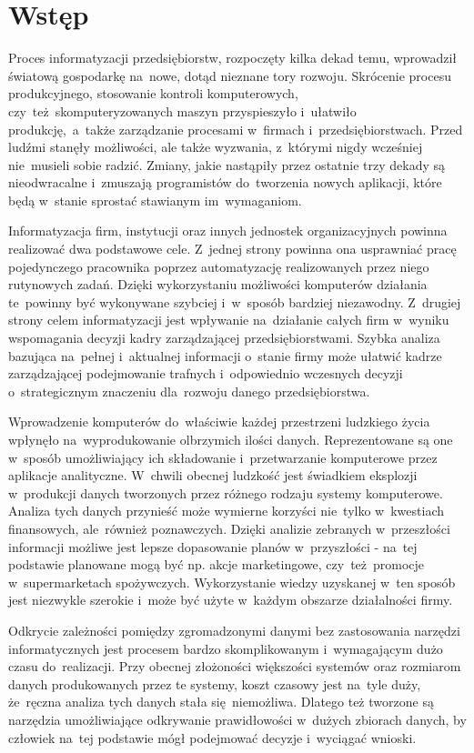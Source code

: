 \chapter{Wstęp}
Proces informatyzacji przedsiębiorstw, rozpoczęty kilka dekad temu, wprowadził światową gospodarkę na~nowe, dotąd nieznane tory rozwoju. Skrócenie procesu produkcyjnego, stosowanie kontroli komputerowych, czy~też~skomputeryzowanych maszyn przyspieszyło i~ułatwiło produkcję,~a~także zarządzanie procesami w~firmach i~przedsiębiorstwach. Przed ludźmi stanęły możliwości, ale także wyzwania, z~którymi nigdy wcześniej nie~musieli sobie radzić. Zmiany, jakie nastąpiły przez ostatnie trzy dekady są nieodwracalne i~zmuszają programistów do~tworzenia nowych aplikacji, które będą w~stanie sprostać stawianym im~wymaganiom.

Informatyzacja firm, instytucji oraz innych jednostek organizacyjnych powinna realizować dwa podstawowe cele. Z~jednej strony powinna ona usprawniać pracę pojedynczego pracownika poprzez automatyzację realizowanych przez niego rutynowych zadań. Dzięki wykorzystaniu możliwości komputerów działania te~powinny być wykonywane szybciej i~w~sposób bardziej niezawodny. Z~drugiej strony celem informatyzacji jest wpływanie na~działanie całych firm w~wyniku wspomagania decyzji kadry zarządzającej przedsiębiorstwami. Szybka analiza bazująca na~pełnej i~aktualnej informacji o~stanie firmy może ułatwić kadrze zarządzającej podejmowanie trafnych i~odpowiednio wczesnych decyzji o~strategicznym znaczeniu dla~rozwoju danego przedsiębiorstwa.

Wprowadzenie komputerów do~właściwie każdej przestrzeni ludzkiego życia wpłynęło na~wyprodukowanie olbrzymich ilości danych. Reprezentowane są one w~sposób umożliwiający ich składowanie i~przetwarzanie komputerowe przez aplikacje analityczne. W~chwili obecnej ludzkość jest świadkiem eksplozji w~produkcji danych tworzonych przez różnego rodzaju systemy komputerowe. Analiza tych danych przynieść może wymierne korzyści nie~tylko w~kwestiach finansowych, ale~również poznawczych. Dzięki analizie zebranych w~przeszłości informacji możliwe jest lepsze dopasowanie planów w~przyszłości - na~tej podstawie planowane mogą być np. akcje marketingowe, czy~też~promocje w~supermarketach spożywczych. Wykorzystanie wiedzy uzyskanej w~ten sposób jest niezwykle szerokie i~może być użyte w~każdym obszarze działalności firmy.

Odkrycie zależności pomiędzy zgromadzonymi danymi bez zastosowania narzędzi informatycznych jest procesem bardzo skomplikowanym i~wymagającym dużo czasu do~realizacji. Przy obecnej złożoności większości systemów oraz rozmiarom danych produkowanych przez te systemy, koszt czasowy jest na~tyle duży, że~ręczna analiza tych danych stała się~niemożliwa. Dlatego też tworzone są narzędzia umożliwiające odkrywanie prawidłowości w~dużych zbiorach danych, by człowiek na~tej podstawie mógł podejmować decyzje i~wyciągać wnioski.

